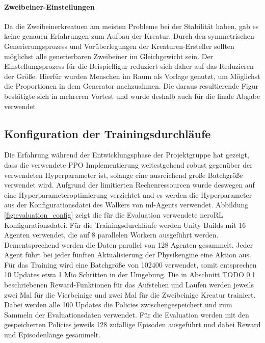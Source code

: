 \paragraph{Zweibeiner-Einstellungen}
Da die Zweibeinerkreatuen am meisten Probleme bei der Stabilität haben, gab es keine genauen Erfahrungen zum Aufbau der Kreatur. Durch den symmetrischen Generierungsprozess und Vorüberlegungen der Kreaturen-Ersteller sollten möglichst alle generierbaren Zweibeiner im Gleichgewicht sein. Der Einstellungsprozess für die Beispielfigur reduziert sich daher auf das Reduzieren der Größe. Hierfür wurden Menschen im Raum als Vorlage genutzt, um Möglichst die Proportionen in dem Generator nachzuahmen. Die daraus resultierende Figur bestätigte sich in mehreren Vortest und wurde deshalb auch für die finale Abgabe verwendet

\subsection{Konfiguration der Trainingsdurchläufe}
Die Erfahrung während der Entwicklungsphase der Projektgruppe hat gezeigt, dass die verwendete PPO Implementierung weitestgehend robust gegenüber der verwendeten Hyperparameter ist, solange eine ausreichend große Batchgröße verwendet wird. Aufgrund der limitierten Rechenressourcen wurde deswegen auf eine Hyperparameteroptimierung verzichtet und es werden die Hyperparameter aus der Konfigurationsdatei des Walkers von ml-Agents verwendet. Abbildung \ref{fig:evaluation_config} zeigt die für die Evaluation verwendete neroRL Konfigurationsdatei. 
Für die Trainingsdurchläufe werden Unity Builds mit 16 Agenten verwendet, die auf 8 parallelen Workern ausgeführt werden. Dementsprechend werden die Daten parallel von 128 Agenten gesammelt. Jeder Agent führt bei jeder fünften Aktualisierung der Physikengine eine Aktion aus. Für das Training wird eine Batchgröße von 102400 verwendet, somit entsprechen 10 Updates etwa 1 Mio Schritten in der Umgebung.
Die in Abschnitt TODO \ref{} beschriebenen Reward-Funktionen für das Aufstehen und Laufen werden jeweils zwei Mal für die Vierbeinige und zwei Mal für die Zweibeinige Kreatur trainiert. Dabei werden alle 100 Updates die Policies zwischengespeichert und zum Sammeln der Evaluationsdaten verwendet. Für die Evaluation werden mit den gespeicherten Policies jeweils 128 zufällige Episoden ausgeführt und dabei Reward und Episodenlänge gesammelt.

